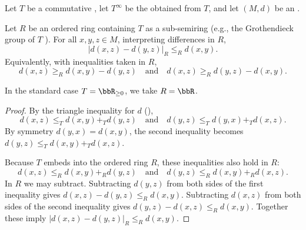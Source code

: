 \begin{proposition} \label{proposition:reverse_triangle_inequality_in_extended_metric_space}
    Let $T$ be a commutative , let $T^\infty$ be the  obtained from $T$, and let $(M, d)$ be an .

    Let $R$ be an ordered ring containing $T$ as a sub-semiring (e.g., the Grothendieck group of $T$ ). For all $x, y, z \in M$, interpreting differences in $R$,
    \[
    |d(x, z) - d(y, z)|_R \leq_R d(x, y).
    \]
    Equivalently, with inequalities taken in $R$,
    \[
    d(x, z) \geq_R d(x, y) - d(y, z)
    \quad\text{and}\quad
    d(x, z) \geq_R d(y, z) - d(x, y).
    \]

    In the standard case $T = \bbR_{\geq 0}$, we take $R = \bbR$.
\end{proposition}
\begin{proof}
    By the triangle inequality for $d$ (),
    \[
    d(x, z) \leq_T d(x, y) +_T d(y, z)
    \quad\text{and}\quad
    d(y, z) \leq_T d(y, x) +_T d(x, z).
    \]
    By symmetry $d(y, x) = d(x, y)$, the second inequality becomes $d(y, z) \leq_T d(x, y) +_T d(x, z)$.

    Because $T$ embeds into the ordered ring $R$, these inequalities also hold in $R$:
    \[
    d(x, z) \leq_R d(x, y) +_R d(y, z)
    \quad\text{and}\quad
    d(y, z) \leq_R d(x, y) +_R d(x, z).
    \]
    In $R$ we may subtract. Subtracting $d(y, z)$ from both sides of the first inequality gives $d(x, z) - d(y, z) \leq_R d(x, y)$. Subtracting $d(x, z)$ from both sides of the second inequality gives $d(y, z) - d(x, z) \leq_R d(x, y)$. Together these imply $|d(x, z) - d(y, z)|_R \leq_R d(x, y)$.
\end{proof}